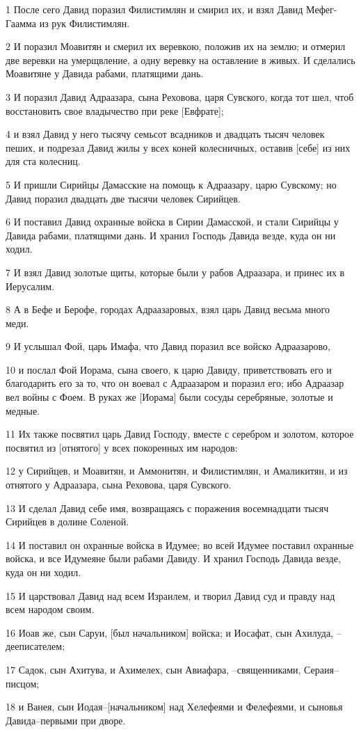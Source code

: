 \par 1 После сего Давид поразил Филистимлян и смирил их, и взял Давид Мефег-Гаамма из рук Филистимлян.
\par 2 И поразил Моавитян и смерил их веревкою, положив их на землю; и отмерил две веревки на умерщвление, а одну веревку на оставление в живых. И сделались Моавитяне у Давида рабами, платящими дань.
\par 3 И поразил Давид Адраазара, сына Реховова, царя Сувского, когда тот шел, чтоб восстановить свое владычество при реке [Евфрате];
\par 4 и взял Давид у него тысячу семьсот всадников и двадцать тысяч человек пеших, и подрезал Давид жилы у всех коней колесничных, оставив [себе] из них для ста колесниц.
\par 5 И пришли Сирийцы Дамасские на помощь к Адраазару, царю Сувскому; но Давид поразил двадцать две тысячи человек Сирийцев.
\par 6 И поставил Давид охранные войска в Сирии Дамасской, и стали Сирийцы у Давида рабами, платящими дань. И хранил Господь Давида везде, куда он ни ходил.
\par 7 И взял Давид золотые щиты, которые были у рабов Адраазара, и принес их в Иерусалим.
\par 8 А в Бефе и Берофе, городах Адраазаровых, взял царь Давид весьма много меди.
\par 9 И услышал Фой, царь Имафа, что Давид поразил все войско Адраазарово,
\par 10 и послал Фой Иорама, сына своего, к царю Давиду, приветствовать его и благодарить его за то, что он воевал с Адраазаром и поразил его; ибо Адраазар вел войны с Фоем. В руках же [Иорама] были сосуды серебряные, золотые и медные.
\par 11 Их также посвятил царь Давид Господу, вместе с серебром и золотом, которое посвятил из [отнятого] у всех покоренных им народов:
\par 12 у Сирийцев, и Моавитян, и Аммонитян, и Филистимлян, и Амаликитян, и из отнятого у Адраазара, сына Реховова, царя Сувского.
\par 13 И сделал Давид себе имя, возвращаясь с поражения восемнадцати тысяч Сирийцев в долине Соленой.
\par 14 И поставил он охранные войска в Идумее; во всей Идумее поставил охранные войска, и все Идумеяне были рабами Давиду. И хранил Господь Давида везде, куда он ни ходил.
\par 15 И царствовал Давид над всем Израилем, и творил Давид суд и правду над всем народом своим.
\par 16 Иоав же, сын Саруи, [был начальником] войска; и Иосафат, сын Ахилуда, --дееписателем;
\par 17 Садок, сын Ахитува, и Ахимелех, сын Авиафара, --священниками, Сераия--писцом;
\par 18 и Ванея, сын Иодая--[начальником] над Хелефеями и Фелефеями, и сыновья Давида--первыми при дворе.

